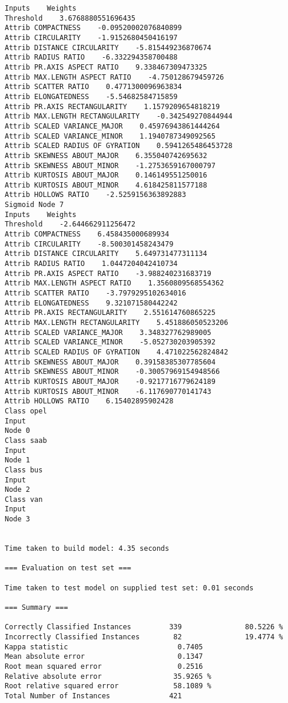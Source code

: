 \documentclass[
	article,			%
	11pt,				%
	oneside,			%
	a4paper,			%
	english,			%
	brazil,				%
	sumario=tradicional
	]{abntex2}
\begin{document}
\begin{lstlisting}
Inputs    Weights
Threshold    3.6768880551696435
Attrib COMPACTNESS    -0.09520002076840899
Attrib CIRCULARITY    -1.9152680450416197
Attrib DISTANCE CIRCULARITY    -5.815449236870674
Attrib RADIUS RATIO    -6.332294358700488
Attrib PR.AXIS ASPECT RATIO    9.338467309473325
Attrib MAX.LENGTH ASPECT RATIO    -4.750128679459726
Attrib SCATTER RATIO    0.4771300096963834
Attrib ELONGATEDNESS    -5.54682584715859
Attrib PR.AXIS RECTANGULARITY    1.1579209654818219
Attrib MAX.LENGTH RECTANGULARITY    -0.342549270844944
Attrib SCALED VARIANCE_MAJOR    0.45976943861444264
Attrib SCALED VARIANCE_MINOR    1.1940787349092565
Attrib SCALED RADIUS OF GYRATION    0.5941265486453728
Attrib SKEWNESS ABOUT_MAJOR    6.355040742695632
Attrib SKEWNESS ABOUT_MINOR    -1.2753659167000797
Attrib KURTOSIS ABOUT_MAJOR    0.146149551250016
Attrib KURTOSIS ABOUT_MINOR    4.618425811577188
Attrib HOLLOWS RATIO    -2.5259156363892883
Sigmoid Node 7
Inputs    Weights
Threshold    -2.644662911256472
Attrib COMPACTNESS    6.458435000689934
Attrib CIRCULARITY    -8.500301458243479
Attrib DISTANCE CIRCULARITY    5.649731477311134
Attrib RADIUS RATIO    1.0447204042410734
Attrib PR.AXIS ASPECT RATIO    -3.988240231683719
Attrib MAX.LENGTH ASPECT RATIO    1.3560809568554362
Attrib SCATTER RATIO    -3.7979295102634016
Attrib ELONGATEDNESS    9.321071580442242
Attrib PR.AXIS RECTANGULARITY    2.551614760865225
Attrib MAX.LENGTH RECTANGULARITY    5.451886050523206
Attrib SCALED VARIANCE_MAJOR    3.348327762989005
Attrib SCALED VARIANCE_MINOR    -5.052730203905392
Attrib SCALED RADIUS OF GYRATION    4.471022562824842
Attrib SKEWNESS ABOUT_MAJOR    0.39158385307785604
Attrib SKEWNESS ABOUT_MINOR    -0.30057969154948566
Attrib KURTOSIS ABOUT_MAJOR    -0.9217716779624189
Attrib KURTOSIS ABOUT_MINOR    -6.117690770141743
Attrib HOLLOWS RATIO    6.15402895902428
Class opel
Input
Node 0
Class saab
Input
Node 1
Class bus
Input
Node 2
Class van
Input
Node 3


Time taken to build model: 4.35 seconds

=== Evaluation on test set ===

Time taken to test model on supplied test set: 0.01 seconds

=== Summary ===

Correctly Classified Instances         339               80.5226 %
Incorrectly Classified Instances        82               19.4774 %
Kappa statistic                          0.7405
Mean absolute error                      0.1347
Root mean squared error                  0.2516
Relative absolute error                 35.9265 %
Root relative squared error             58.1089 %
Total Number of Instances              421     


\end{lstlisting}
\end{document}
